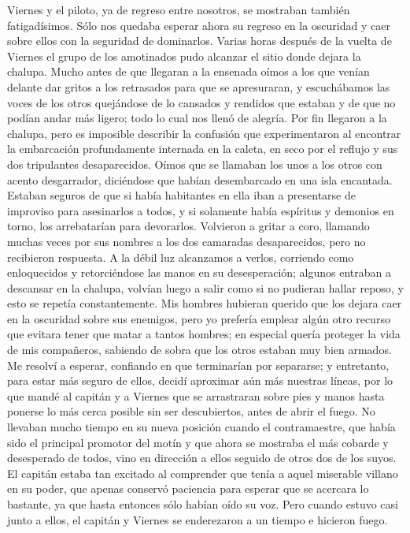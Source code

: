 \documentclass{novela}
\begin{document}
    Viernes y el piloto, ya de regreso entre nosotros, se mostraban también fatigadísimos.
    Sólo nos quedaba esperar ahora su regreso en la oscuridad y caer sobre ellos con la seguridad de dominarlos.
    Varias horas después de la vuelta de Viernes el grupo de los amotinados pudo alcanzar el sitio donde dejara la chalupa. Mucho antes de que llegaran a la ensenada oímos a los que venían delante dar gritos a los retrasados para que se apresuraran, y escuchábamos las voces de los otros quejándose de lo cansados y rendidos que estaban y de que no podían andar más ligero; todo lo cual nos llenó de alegría. Por fin llegaron a la chalupa, pero es imposible describir la confusión que experimentaron al encontrar la embarcación profundamente internada en la caleta, en seco por el reflujo y sus dos tripulantes desaparecidos. Oímos que se llamaban los unos a los otros con acento desgarrador, diciéndose que habían desembarcado en una isla encantada. Estaban seguros de que si había habitantes en ella iban a presentarse de improviso para asesinarlos a todos, y si solamente había espíritus y demonios en torno, los arrebatarían para devorarlos.
    Volvieron a gritar a coro, llamando muchas veces por sus nombres a los dos camaradas desaparecidos, pero no recibieron respuesta. A la débil luz alcanzamos a verlos, corriendo como enloquecidos y retorciéndose las manos en su desesperación; algunos entraban a descansar en la chalupa, volvían luego a salir como si no pudieran hallar reposo, y esto se repetía constantemente.
    Mis hombres hubieran querido que los dejara caer en la oscuridad sobre sus enemigos, pero yo prefería emplear algún otro recurso que evitara tener que matar a tantos hombres; en especial quería proteger la vida de mis compañeros, sabiendo de sobra que los otros estaban muy bien armados. Me resolví a esperar, confiando en que terminarían por separarse; y entretanto, para estar más seguro de ellos, decidí aproximar aún más nuestras líneas, por lo que mandé al capitán y a Viernes que se arrastraran sobre pies y manos hasta ponerse lo más cerca posible sin ser descubiertos, antes de abrir el fuego.
    No llevaban mucho tiempo en su nueva posición cuando el contramaestre, que había sido el principal promotor del motín y que ahora se mostraba el más cobarde y desesperado de todos, vino en dirección a ellos seguido de otros dos de los suyos.
    El capitán estaba tan excitado al comprender que tenía a aquel miserable villano en su poder, que apenas conservó paciencia para esperar que se acercara lo bastante, ya que hasta entonces sólo habían oído su voz. Pero cuando estuvo casi junto a ellos, el capitán y Viernes se enderezaron a un tiempo e hicieron fuego.
\end{document}
